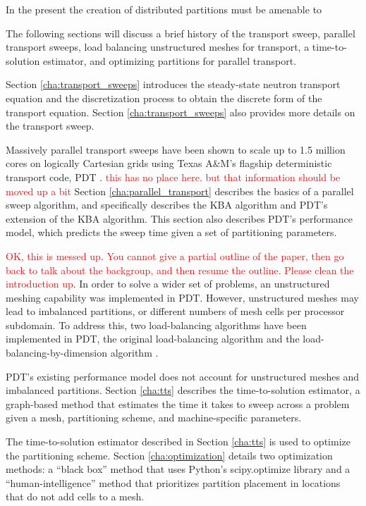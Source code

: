 \documentclass[times,final]{elsarticle}
\newcommand{\tcr}[1]{\textcolor{red}{#1}}
\begin{document}
In the present the creation of distributed partitions must be amenable to   

The following sections will discuss a brief history of the transport sweep, parallel transport sweeps, load balancing unstructured meshes for transport, a time-to-solution estimator, and optimizing partitions for parallel transport.

Section \ref{cha:transport_sweeps} introduces the steady-state neutron transport equation and the discretization process to obtain the discrete form of the transport equation. Section \ref{cha:transport_sweeps} also provides more details on the transport sweep.

Massively parallel transport sweeps have been shown to scale up to 1.5 million cores on logically Cartesian grids using Texas A\&M's flagship deterministic transport code, PDT \cite{mpadams2013,mpadams2015}. \tcr{this has no place here. but that information should be moved up a bit}
Section \ref{cha:parallel_transport} describes the basics of a parallel sweep algorithm, and specifically describes the KBA algorithm \cite{KBA} and PDT's extension of the KBA algorithm.
This section also describes PDT's performance model, which predicts the sweep time given a set of partitioning parameters.

\tcr{OK, this is messed up. You cannot give a partial outline of the paper, then go back to talk about the backgroup, and then resume the outline. Please clean the introduction up}. In order to solve a wider set of problems, an unstructured meshing capability was implemented in PDT.
However, unstructured meshes may lead to imbalanced partitions, or different numbers of mesh cells per processor subdomain.
To address this, two load-balancing algorithms have been implemented in PDT, the original load-balancing algorithm and the load-balancing-by-dimension algorithm \cite{mastersthesis,mc2017}.

PDT's existing performance model does not account for unstructured meshes and imbalanced partitions.
Section \ref{cha:tts} describes the time-to-solution estimator, a graph-based method that estimates the time it takes to sweep across a problem given a mesh, partitioning scheme, and machine-specific parameters.

The time-to-solution estimator described in Section \ref{cha:tts} is used to optimize the partitioning scheme.
Section \ref{cha:optimization} details two optimization methods: a ``black box'' method that uses Python's scipy.optimize library and a ``human-intelligence'' method that prioritizes partition placement in locations that do not add cells to a mesh.
\end{document}
